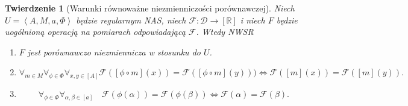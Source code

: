 \documentclass[12pt,a4paper]{report}
\newtheorem{tw}[definition]{Twierdzenie}
\newcommand{\domkniecie}[1]{\left\lbrack{#1}\right\rbrack}
\newcommand{\tuple}[1]{\left\langle {#1} \right\rangle}
\begin{document}
\begin{tw}[Warunki równoważne niezmienniczości porównawczej]
Niech $U=\tuple{A,M,a,\Phi}$ będzie regularnym NAS, niech $\mathcal{F}:\mathcal{D}\to \domkniecie{\mathbb{R}}$ i niech $F$ będzie uogólnioną operacją na pomiarach odpowiadającą $\mathcal{F}$. Wtedy
NWSR
\begin{enumerate}
\item
$F$ jest porównawczo niezmiennicza w stosunku do $U$.
\item
$$
\forall_{m \in M}\forall_{\phi \in \Phi} \forall_{x,y \in \domkniecie{A}} \mathcal{F}(\domkniecie{\phi \circ m}(x))=\mathcal{F}(\domkniecie{\phi \circ m}(y))) \iff \mathcal{F}(\domkniecie{m}(x))=\mathcal{F}(\domkniecie{m}(y)).
$$
\item
$$
\forall_{\phi \in \Phi} \forall_{\alpha, \beta \in \domkniecie{a}}  \quad \mathcal{F}(\phi(\alpha))=\mathcal{F}(\phi(\beta)) \iff \mathcal{F}(\alpha)=\mathcal{F}(\beta).
$$
\end{enumerate}

\end{tw}
\end{document}
